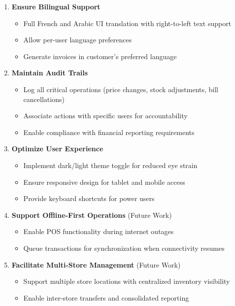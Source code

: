 \begin{enumerate}[leftmargin=*]
    \item \textbf{Ensure Bilingual Support}
    \begin{itemize}
        \item Full French and Arabic UI translation with right-to-left text support
        \item Allow per-user language preferences
        \item Generate invoices in customer's preferred language
    \end{itemize}
    
    \item \textbf{Maintain Audit Trails}
    \begin{itemize}
        \item Log all critical operations (price changes, stock adjustments, bill cancellations)
        \item Associate actions with specific users for accountability
        \item Enable compliance with financial reporting requirements
    \end{itemize}
    
    \item \textbf{Optimize User Experience}
    \begin{itemize}
        \item Implement dark/light theme toggle for reduced eye strain
        \item Ensure responsive design for tablet and mobile access
        \item Provide keyboard shortcuts for power users
    \end{itemize}
    
    \item \textbf{Support Offline-First Operations} (Future Work)
    \begin{itemize}
        \item Enable POS functionality during internet outages
        \item Queue transactions for synchronization when connectivity resumes
    \end{itemize}
    
    \item \textbf{Facilitate Multi-Store Management} (Future Work)
    \begin{itemize}
        \item Support multiple store locations with centralized inventory visibility
        \item Enable inter-store transfers and consolidated reporting
    \end{itemize}
\end{enumerate}

